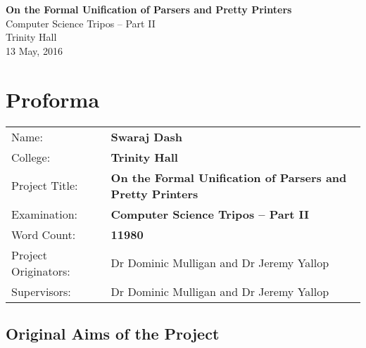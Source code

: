 \documentclass[12pt,a4paper,twoside,openright]{report}
\begin{document}


 \pagestyle{empty}
 
 
 \vspace*{60mm}
 \begin{center}
 \Huge
 \textbf{On the Formal Unification of Parsers and Pretty Printers} \\[5mm]
 Computer Science Tripos -- Part II \\[5mm]
 Trinity Hall \\[5mm]
 
 13 May, 2016  %
 \end{center}
 
 
 
 \pagestyle{plain}
 
 \chapter*{Proforma}
 
 \vspace{-3em}
 {\large
 \begin{tabular}{l p{4.3in}}
 Name:               & \bf Swaraj Dash                       \\
 College:            & \bf Trinity Hall                     \\
 Project Title:      & \bf On the Formal Unification of Parsers and Pretty Printers \\
 Examination:        & \bf Computer Science Tripos -- Part II \\
 Word Count:         & \bf 11980\\
 Project Originators: & Dr Dominic Mulligan and Dr Jeremy Yallop                    \\
 Supervisors:         & Dr Dominic Mulligan and Dr Jeremy Yallop       \\ 
 \end{tabular}
 }
 
 \vspace{-1em}
 \section*{Original Aims of the Project}
 
\end{document}
